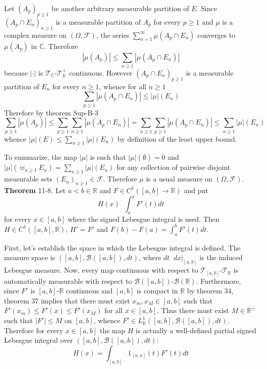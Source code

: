 \documentclass[a4paper]{article}
\newcommand{\clo}[1]{\left [ #1 \right ]}
\newcommand{\brac}[1]{\left ( #1 \right )}
\newcommand{\induc}[1]{\left . #1 \right \vert}
\newcommand{\abs}[1]{\left | #1 \right |}
\newcommand{\Real}{\mathbb{R}}
\newcommand{\Cplx}{\mathbb{C}}
\newcommand{\Tcal}{\mathcal{T}}
\newcommand{\Fcal}{\mathcal{F}}
\newcommand{\borel}[1]{\mathcal{B}\brac{#1}}
\newcommand{\defn}{\mathop{\overset{\Delta}{=}}\nolimits}
\begin{document}
Let $\brac{A_p}_{p\geq1}$ be another arbitrary measurable partition of $E$. Since $\brac{A_p\cap E_n}_{n\geq1}$ is a measurable partition of $A_p$ for every $p\geq 1$ and $\mu$ is a complex measure on $\brac{\Omega, \Fcal}$, the series $\sum_{n=1}^\infty \mu\brac{A_p\cap E_n}$ converges to $\mu\brac{A_p}$ in $\Cplx$. Therefore \[\abs{\mu\brac{A_p}} \leq \sum_{n\geq 1} \abs{\mu\brac{A_p\cap E_n}}\] because $\abs{\cdot}$ is $\Tcal_\Cplx$-$\Tcal_\Real^+$ continuous. However $\brac{A_p\cap E_n}_{p\geq1}$ is a measurable partition of $E_n$ for every $n\geq 1$, whence for all $n\geq1$ \[\sum_{p\geq 1} \abs{\mu\brac{A_p\cap E_n}}\leq \abs{\mu}\brac{E_n}\] Therefore by theorem Sup-B-3 \[\sum_{p\geq1 }\abs{\mu\brac{A_p}} \leq \sum_{p\geq 1}\sum_{n\geq 1} \abs{\mu\brac{A_p\cap E_n}} = \sum_{n\geq 1}\sum_{p\geq 1} \abs{\mu\brac{A_p\cap E_n}}\leq \sum_{n\geq 1}\abs{\mu}\brac{E_n}\] whence $\abs{\mu}\brac{E}\leq \sum_{n\geq 1}\abs{\mu}\brac{E_n}$ by definition of the least upper bound.

To summarize, the map $\abs{\mu}$ is such that $\abs{\mu}\brac{\emptyset}=0$ and $\abs{\mu}\brac{\uplus_{n\geq 1} E_n} = \sum_{n\geq 1} \abs{\mu}\brac{E_n}$ for any collection of pairwise disjoint measurable sets $\brac{E_n}_{n\geq1}\in \Fcal$. Therefore $\mu$ is a usual measure on $\brac{\Omega, \Fcal}$.\\

\label{thm:main_calculus_theorem} \noindent \textbf{Theorem} 11-8.
Let $a<b\in \Real$ and $F\in C^1\brac{\clo{a,b}\to \Real}$ and put \[H\brac{x}\defn \int_a^x F'\brac{t} dt\] for every $x\in \clo{a,b}$ where the signed Lebesgue integral is used. Then $H\in C^1\brac{\clo{a,b}, \Real}$, $H'=F'$ and $F\brac{b}-F\brac{a} = \int_a^b F'\brac{t} dt$.

First, let's establish the space in which the Lebesgue integral is defined. The measure space is $\brac{\clo{a,b}, \borel{\clo{a,b}}, dt}$, where $dt\defn \induc{dx}_{\clo{a,b}}$ is the induced Lebesgue measure. Now, every map continuous with respect to $\Tcal_{\clo{a,b}}$-$\Tcal_\Real$ is automatically measurable with respect to $\borel{\clo{a,b}}$-$\borel{\Real}$. Furthermore, since $F'$ is $\clo{a,b}$-$\Real$ continuous and $\clo{a,b}$ is compact in $\Real$ by theorem 34, theorem 37 implies that there must exist $x_m,x_M\in \clo{a,b}$ such that $F'\brac{x_m}\leq F'\brac{x}\leq F'\brac{x_M}$ for all $x\in \clo{a,b}$. Thus there must exist $M\in \Real^+$ such that $\abs{F'}\leq M$ on $\clo{a,b}$, whence $F'\in L^1_\Real\brac{\clo{a,b}, \borel{\clo{a,b}}, dt}$. Therefore for every $x\in \clo{a,b}$ the map $H$ is actually a well-defined partial signed Lebesgue integral over $\brac{\clo{a,b}, \borel{\clo{a,b}}, dt}$: \[H\brac{x}=\int_{\clo{a,b}} 1_{\clo{a,x}}\brac{t} F'\brac{t} dt\]
\end{document}
